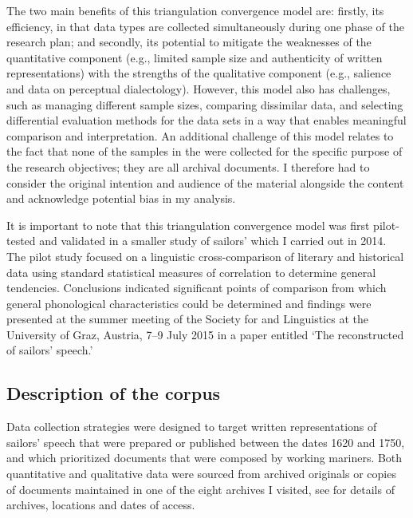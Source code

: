 The two main benefits of this triangulation convergence model are: firstly, its efficiency, in that data types are collected simultaneously during one phase of the research plan; and secondly, its potential to mitigate the weaknesses of the quantitative component (e.g., limited sample size and authenticity of written representations) with the strengths of the qualitative component (e.g., salience and data on perceptual dialectology). However, this model also has challenges, such as managing different sample sizes, comparing dissimilar data, and selecting differential evaluation methods for the data sets in a way that enables meaningful comparison and interpretation. An additional challenge of this model relates to the fact that none of the samples in the  were collected for the specific purpose of the research objectives; they are all archival documents. I therefore had to consider the original intention and audience of the material alongside the content and acknowledge potential bias in my analysis. 



It is important to note that this triangulation convergence model was first pilot-tested and validated in a smaller study of sailors’  which I carried out in 2014. The pilot study focused on a linguistic cross-comparison of literary and historical data using standard statistical measures of correlation to determine general tendencies. Conclusions indicated significant points of comparison from which general phonological characteristics could be determined and findings were presented at the summer meeting of the Society for  and  Linguistics at the University of Graz, Austria, 7–9 July {2015} in a paper entitled ‘The reconstructed  of  sailors’ speech.’



\subsection{{Description of the corpus}}\label{sec:1.3.2}



Data collection strategies were designed to target written representations of sailors’ speech that were prepared or published between the dates 1620 and 1750, and which prioritized documents that were composed by working mariners. Both quantitative and qualitative data were sourced from archived originals or copies of documents maintained in one of the eight archives I visited, see  for details of archives, locations and dates of access.


